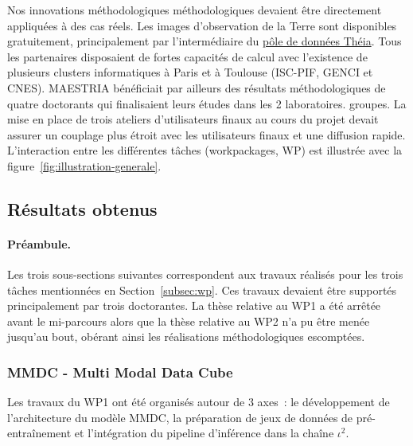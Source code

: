 Nos innovations méthodologiques méthodologiques devaient être directement appliquées à des cas réels. Les images d'observation de la Terre sont disponibles gratuitement, principalement par l'intermédiaire du \href{https://www.theia-land.fr/pole-theia-2/}{pôle de données Théia}. Tous les partenaires disposaient de fortes capacités
de calcul avec l'existence de plusieurs clusters informatiques à Paris et à Toulouse (ISC-PIF, GENCI et CNES). MAESTRIA bénéficiait par ailleurs des résultats méthodologiques de quatre doctorants qui finalisaient leurs études dans les 2 laboratoires. groupes. La mise en place de trois ateliers d'utilisateurs finaux au cours du projet devait assurer un couplage plus étroit avec les utilisateurs finaux et une diffusion rapide.\\

L'interaction entre les différentes tâches (workpackages, WP) est illustrée avec la figure~\ref{fig:illustration-generale}.


\subsection{Résultats obtenus}


\paragraph{Préambule.}
Les trois sous-sections suivantes correspondent aux travaux réalisés pour les trois tâches mentionnées en Section~\ref{subsec:wp}. Ces travaux devaient être supportés principalement par trois doctorant\textperiodcentered e\textperiodcentered s. La thèse relative au WP1 a été arrêtée avant le mi-parcours alors que la thèse relative au WP2 n'a pu être menée jusqu'au bout, obérant ainsi les réalisations méthodologiques escomptées.


\subsubsection{MMDC - Multi Modal Data Cube}
\label{subsec:mmdc}
Les travaux du WP1 ont été organisés autour de 3 axes : le développement de l’architecture du modèle MMDC, la préparation de jeux de données de pré-entraînement et l’intégration du pipeline d’inférence dans la chaîne $\iota^2$.

